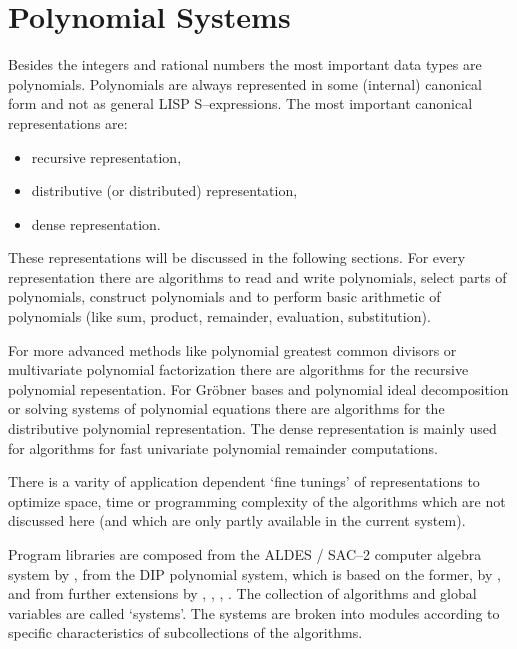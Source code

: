 

\chapter{Polynomial Systems}

Besides the integers and rational numbers the most important 
data types are polynomials. 
Polynomials are always represented in some 
(internal) canonical form and not as general LISP S--expressions. 
The most important canonical representations are:
\begin{itemize}
\item recursive representation,
\item distributive (or distributed) representation,
\item dense representation.
\end{itemize}
These representations will be discussed in the following sections.
For every representation there are algorithms to 
read and write polynomials, select parts of polynomials,
construct polynomials and to
perform basic arithmetic of polynomials  
(like sum, product, remainder, evaluation, substitution). 

For more advanced methods like 
polynomial greatest common divisors or 
multivariate polynomial factorization there are 
algorithms for the recursive polynomial repesentation.
For Gr\"obner bases and 
polynomial ideal decomposition or 
solving systems of polynomial equations there are 
algorithms for the distributive polynomial representation. 
The dense representation is mainly used 
for algorithms for fast univariate polynomial remainder 
computations.

There is a varity of 
application dependent `fine tunings' of representations 
to optimize space, time or programming complexity 
of the algorithms 
which are not discussed here 
(and which are only partly available in the current system).   

Program libraries are composed from the
ALDES / SAC--2 computer algebra system by \cite{Collins 82},
from the DIP polynomial system, which is based on the former,
by \cite{Gebauer Kredel 83}, \cite{Gebauer Kredel 83a}
and from further extensions by \cite{Kredel 87},
\cite{Kredel 88a}, \cite{Kredel 88b}, \cite{Kredel 90a}.
The collection of algorithms and global variables
are called `systems'. The systems are broken
into modules according to specific characteristics
of subcollections of the algorithms.

